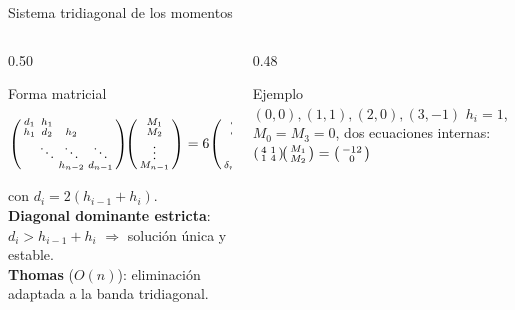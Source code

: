 \documentclass[aspectratio=169,10pt]{beamer}
\begin{document}
\begin{frame}{Sistema tridiagonal de los momentos}
\begin{columns}[T]
\begin{column}{0.50\textwidth}
\begin{cardidea}{Forma matricial}{\faSuperscript}
{\footnotesize\centering
$\begin{psmallmatrix} d_1 & h_1 & & \\ h_1 & d_2 & h_2 & \\ & \ddots & \ddots & \ddots \\ & & h_{n-2} & d_{n-1} \end{psmallmatrix}\!\begin{psmallmatrix} M_1\\ M_2\\ \vdots\\ M_{n-1}\end{psmallmatrix}=6\begin{psmallmatrix}\delta_1\\ \delta_2\\ \vdots\\ \delta_{n-1}\end{psmallmatrix}$\par\vspace{1.2mm}\raggedright
con $d_i=2(h_{i-1}+h_i)$.\\[1.0mm]
\textbf{Diagonal dominante estricta}: $d_i>h_{i-1}{+}h_i$ $\Rightarrow$ solución única y estable.\\[1.0mm]
\textbf{Thomas} ($O(n)$): eliminación adaptada a la banda tridiagonal.}
\end{cardidea}
\end{column}
\begin{column}{0.48\textwidth}
\begin{cardgear}{Ejemplo $(0,0),(1,1),(2,0),(3,-1)$}{\faCalculator}
{\footnotesize $h_i=1$, $M_0=M_3=0$, dos ecuaciones internas:\\[0.6mm]
$\begin{psmallmatrix}4&1\\ 1&4\end{psmallmatrix}\!\begin{psmallmatrix}M_1\\ M_2\end{psmallmatrix}=\begin{psmallmatrix}-12\\ 0\end{psmallmatrix}$\\[1.0mm]
}
\end{cardgear}
\end{column}
\end{columns}
\end{frame}
\end{document}
